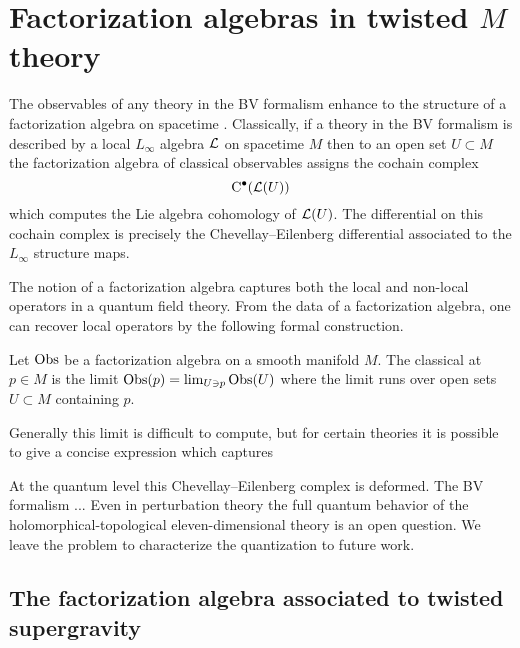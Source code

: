 

%

\section{Factorization algebras in twisted $M$ theory}

The observables of any theory in the BV formalism enhance to the structure of a factorization algebra on spacetime \cite{CG2}. 
Classically, if a theory in the BV formalism is described by a local $L_\infty$ algebra $\mathcal L$ on spacetime $M$ then to an open set $U \subset M$ the factorization algebra of classical observables assigns the cochain complex
\[
{\rm C}^\bullet(\mathcal L(U))
\]
which computes the Lie algebra cohomology of $\mathcal L(U)$. 
The differential on this cochain complex is precisely the Chevellay--Eilenberg differential associated to the $L_\infty$ structure maps. 

\begin{rmk}
The notion of a factorization algebra captures both the local and non-local operators in a quantum field theory. 
From the data of a factorization algebra, one can recover local operators by the following formal construction. 

Let $\operatorname{Obs}$ be a factorization algebra on a smooth manifold $M$.
The classical  at $p \in M$ is the limit $\operatorname{Obs}(p) = \lim_{U \ni p} \operatorname{Obs}(U)$ where the limit runs over open sets $U \subset M$ containing $p$.

Generally this limit is difficult to compute, but for certain theories it is possible to give a concise expression which captures 
\end{rmk}

At the quantum level this Chevellay--Eilenberg complex is deformed.
The BV formalism ...
Even in perturbation theory the full quantum behavior of the holomorphical-topological eleven-dimensional theory is an open question. 
We leave the problem to characterize the quantization to future work. 

\subsection{The factorization algebra associated to twisted supergravity}

\parsec[s:sugraobs]

